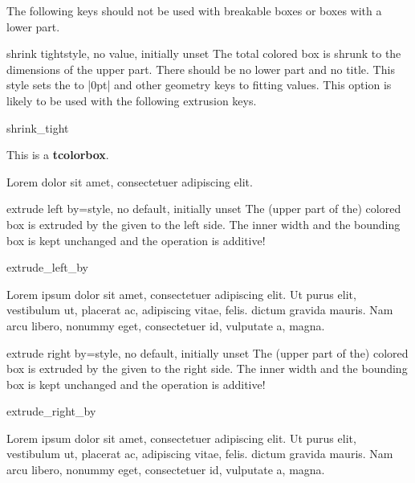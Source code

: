 \begin{marker}
The following keys should not be used with breakable boxes or boxes with a
lower part.
\end{marker}

\begin{docTcbKey}{shrink tight}{}{style, no value, initially unset}
  The total colored box is shrunk to the dimensions of the upper
  part. There should be no lower part and no title.
  This style sets the  to |0pt| and other geometry keys
  to fitting values. This option is likely to be used with the following
  extrusion keys.
\begin{exdispExample}{shrink_tight}

\begin{tcolorbox}
This is a \textbf{tcolorbox}.
\end{tcolorbox}

Lorem  dolor sit amet, consectetuer adipiscing elit.
\end{exdispExample}
\end{docTcbKey}

\begin{docTcbKey}[][doc updated=2014-09-19]{extrude left by}{=}{style, no default, initially unset}
  The (upper part of the) colored box is extruded by the given  to the left side.
  The inner width and the bounding box is kept unchanged and the operation
  is additive!
\begin{exdispExample}{extrude_left_by}

Lorem ipsum dolor sit amet, consectetuer adipiscing elit. Ut purus elit,
vestibulum ut, placerat ac, adipiscing vitae, felis.
 dictum gravida mauris.
Nam arcu libero, nonummy eget, consectetuer id, vulputate a, magna.
\end{exdispExample}
\end{docTcbKey}

\begin{docTcbKey}[][doc updated=2014-09-19]{extrude right by}{=}{style, no default, initially unset}
  The (upper part of the) colored box is extruded by the given  to the right side.
  The inner width and the bounding box is kept unchanged and the operation
  is additive!
\begin{exdispExample}{extrude_right_by}

Lorem ipsum dolor sit amet, consectetuer adipiscing elit. Ut purus elit,
vestibulum ut, placerat ac, adipiscing vitae, felis.
 dictum gravida mauris.
Nam arcu libero, nonummy eget, consectetuer id, vulputate a, magna.
\end{exdispExample}
\end{docTcbKey}

